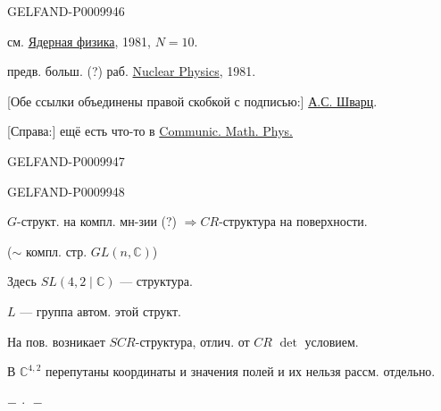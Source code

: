 \begin{GelfandAdjacentEvidence}{GELFAND-P000994}{6}


см. \underline{Ядерная физика}, 1981, $N=10$.

предв. больш. (?) раб. \underline{Nuclear Physics}, 1981.

[Обе ссылки объединены правой скобкой с подписью:] \underline{А.С. Шварц}.

[Справа:] ещё есть что-то в \underline{Communic. Math. Phys.}
\end{GelfandAdjacentEvidence}
\begin{GelfandAdjacentEvidence}{GELFAND-P000994}{7}

\end{GelfandAdjacentEvidence}
\begin{GelfandAdjacentEvidence}{GELFAND-P000994}{8}


$G$-структ. на компл. мн-зии (?) $\Rightarrow CR$-структура на поверхности.
\end{GelfandAdjacentEvidence}


($\sim$ компл. стр. $GL(n,\mathbb C)$)

Здесь $SL(4,2\mid\mathbb C)$ --- структура.

$L$ --- группа автом. этой структ.

На пов. возникает $SCR$-структура, отлич. от $CR$ $\det$ условием.

В $\mathbb C^{4,2}$ перепутаны координаты и значения полей и их нельзя рассм. отдельно.

\begin{center}$-\ \cdot\ -$\end{center}


